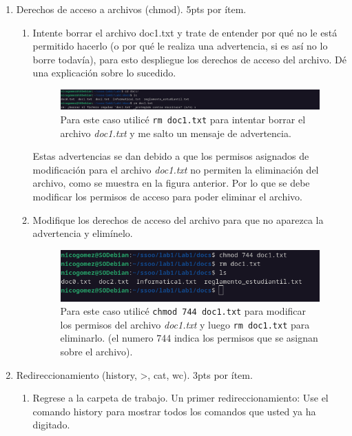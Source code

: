 \documentclass{templateNote}
\begin{document}
\begin{enumerate}
\begin{enumerate}[label=\alph*)]
\begin{figure}[H]
        \end{figure}
    \end{enumerate}
    \item Derechos de acceso a archivos (chmod). 5pts por ítem.
    \begin{enumerate}[label=\alph*)]
        \item Intente borrar el archivo doc1.txt y trate de entender por qué no le está permitido hacerlo (o por qué le realiza una advertencia, si es así no lo borre todavía), para esto despliegue los derechos de acceso del archivo. Dé una explicación sobre lo sucedido.
        \begin{figure}[H]
            \centering
            \includegraphics[width=\textwidth]{img/ejerc7a.png}
            Para este caso utilicé \texttt{rm doc1.txt} para intentar borrar el archivo \textit{doc1.txt} y me salto un mensaje de advertencia.
        \end{figure}
        Estas advertencias se dan debido a que los permisos asignados de modificación para el archivo \textit{doc1.txt} no permiten la eliminación del archivo, como se muestra en la figura anterior. Por lo que se debe modificar los permisos de acceso para poder eliminar el archivo.
        \item Modifique los derechos de acceso del archivo para que no aparezca la advertencia y elimínelo.
        \begin{figure}[H]
            \centering
            \includegraphics[width=\textwidth]{img/ejerc7b.png}
            Para este caso utilicé \texttt{chmod 744 doc1.txt} para modificar los permisos del archivo \textit{doc1.txt} y
            luego \texttt{rm doc1.txt} para eliminarlo. (el numero 744 indica los permisos que se asignan sobre el archivo).
        \end{figure}
    \end{enumerate}
    \item Redireccionamiento (history, >, cat, wc).  3pts por ítem.
    \begin{enumerate}[label=\alph*)]
        \item Regrese a la carpeta de trabajo. Un primer redireccionamiento: Use el comando history para mostrar todos los comandos que usted ya ha digitado.

\end{enumerate}
\end{enumerate}
\end{document}
